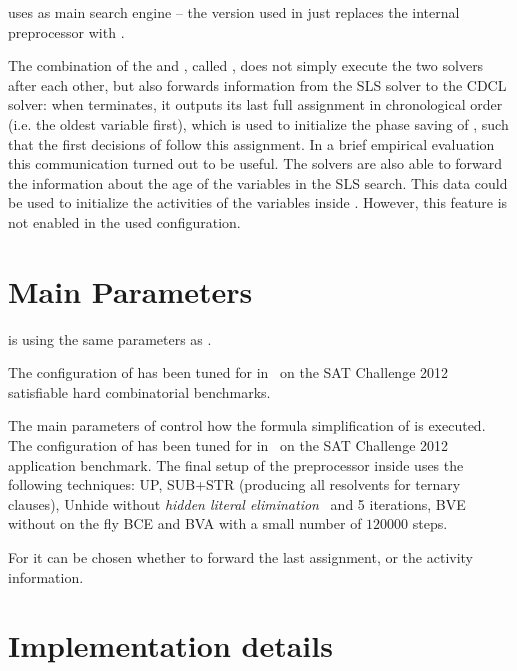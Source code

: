 \documentclass[conference]{IEEEtran}
\begin{document}
\riss uses \glucose as main search engine -- the version used in \str just replaces the internal preprocessor with \cpt. 

The combination of the \sparrow and \riss, called \str, does not simply execute the two solvers after each other, but also forwards information from the SLS solver to the CDCL solver: 
when \sparrow terminates, it outputs its last full assignment in chronological order (i.e. the oldest variable first), which is used to initialize the phase saving of \riss, such that the first decisions of \riss follow this assignment. 
In a brief empirical evaluation this communication turned out to be useful. 
The solvers are also able to forward the information about the age of the variables in the SLS search. This data could be used to initialize the activities of the variables inside \riss. 
However, this feature is not enabled in the used configuration. 

\section{Main Parameters}
\sparrow is using the same parameters as . 

The configuration of \cpt has been tuned for \sparrow in~\cite{bm-pos-2013} on the SAT Challenge 2012 satisfiable hard combinatorial benchmarks.


The main parameters of \riss control how the formula simplification of \cpt is executed. 
The configuration of \cpt has been tuned for \glucose in~\cite{bm-pos-2013} on the SAT Challenge 2012 application benchmark. 
The final setup of the preprocessor inside \riss uses the following techniques:
%
UP, SUB+STR (producing all resolvents for ternary clauses), Unhide without \emph{hidden literal elimination}~\cite{Heule:2011:ECS:2023474.2023497} and 5 iterations, 
BVE without on the fly BCE and BVA with a small number of $120000$ steps.

For \str it can be chosen whether to forward the last assignment, or the activity information. 

% 

\section{Implementation details}
\end{document}
